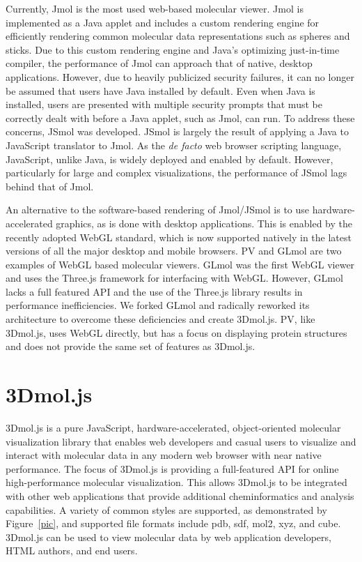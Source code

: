 \documentclass[]{bioinfo}
\begin{document}
Currently, Jmol\cite{jmol,hanson2010jmol} is the most used web-based molecular viewer. Jmol is implemented as a Java applet and includes a custom rendering engine for efficiently rendering common molecular data representations such as spheres and sticks.  Due to this custom rendering engine and Java's optimizing just-in-time compiler, the performance of Jmol can approach that of native, desktop applications.  However, due to heavily publicized security failures, it can no longer be assumed that users have Java installed by default\cite{doomedjava}.  Even when Java is installed, users are presented with multiple security prompts that must be correctly dealt with before a Java applet, such as Jmol, can run.
To address these concerns, JSmol\cite{hanson2013jsmol} was developed. JSmol is largely the result of applying a Java to JavaScript translator to Jmol. As the \textit{de facto} web browser scripting language, JavaScript, unlike Java, is widely deployed and enabled by default.  However, particularly for large and complex visualizations, the performance of JSmol lags behind that of Jmol.

An alternative to the software-based rendering of Jmol/JSmol is to use hardware-accelerated graphics, as is done with desktop applications.  This is enabled by the recently adopted WebGL\cite{webgl} standard, which is now supported natively in the latest versions of all the major desktop and mobile browsers. PV\cite{pv} and GLmol\cite{glmol} are two examples of WebGL based molecular viewers. GLmol was the first WebGL viewer and uses the Three.js\cite{threejs} framework for interfacing with WebGL.  However, GLmol lacks a full featured API and the use of the Three.js library results in performance inefficiencies. We forked GLmol and radically reworked its architecture to overcome these deficiencies and create 3Dmol.js.  PV, like 3Dmol.js, uses WebGL directly, but has a focus on displaying protein structures and does not provide the same set of features as 3Dmol.js.


\section{3Dmol.js}

3Dmol.js is a pure JavaScript, hardware-accelerated, object-oriented molecular visualization library that enables web developers and casual users to visualize and interact with molecular data in any modern web browser with near native performance.  The focus of 3Dmol.js is providing a full-featured API for online high-performance molecular visualization. This allows 3Dmol.js to be integrated with other web applications that provide additional cheminformatics and analysis capabilities.
A variety of common styles are supported, as demonstrated by Figure~\ref{pic}, and supported file formats include pdb, sdf, mol2, xyz, and cube.
3Dmol.js can be used to view molecular data by web application developers, HTML authors, and end users.  
\end{document}
